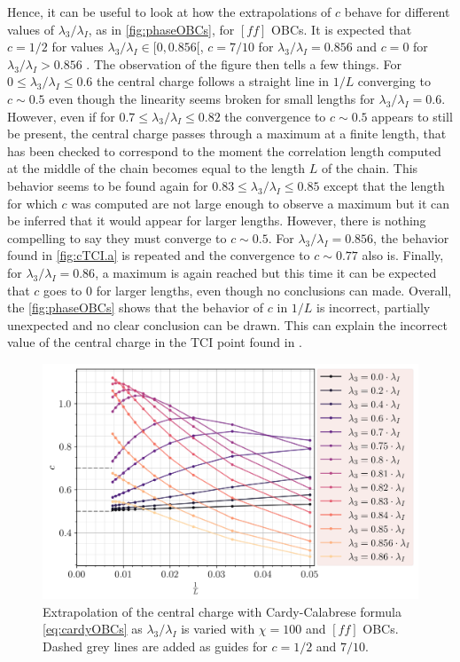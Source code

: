 	Hence, it can be useful to look at how the extrapolations of $c$ behave for different values of $\lambda_3/\lambda_I$, as in \autoref{fig:phaseOBCs}, for $[ff]$ OBCs. It is expected that $c =1/2$ for values $\lambda_3/\lambda_I \in [0, 0.856[$, $c=7/10$ for $\lambda_3/\lambda_I =0.856$ and $c=0$ for $\lambda_3/\lambda_I>0.856$ \cite{obrien2018}. The observation of the figure then tells a few things. For $0\leq \lambda_3/\lambda_I \leq 0.6$ the central charge follows a straight line in $1/L$ converging to $c\sim 0.5$ even though the linearity seems broken for small lengths for $\lambda_3/\lambda_I=0.6$. However, even if for $0.7\leq \lambda_3/\lambda_I \leq 0.82$ the convergence to $c\sim 0.5$ appears to still be present, the central charge passes through a maximum at a finite length, that has been checked to correspond to the moment the correlation length computed at the middle of the chain becomes equal to the length $L$ of the chain. %
	This behavior seems to be found again for $0.83\leq \lambda_3/\lambda_I \leq 0.85$ except that the length for which $c$ was computed are not large enough to observe a maximum but it can be inferred that it would appear for larger lengths. However, there is nothing compelling to say they must converge to $c\sim 0.5$. For $\lambda_3/\lambda_I=0.856$, the behavior found in \autoref{fig:cTCI.a} is repeated and the convergence to $c\sim 0.77$ also is. Finally, for $\lambda_3/\lambda_I=0.86$, a maximum is again reached but this time it can be expected that $c$ goes to $0$ for larger lengths, even though no conclusions can made. Overall, the \autoref{fig:phaseOBCs} shows that the behavior of $c$ in $1/L$ is incorrect, partially unexpected and no clear conclusion can be drawn. This can explain the incorrect value of the central charge in the TCI point found in \cite{obrien2018}.

	\begin{figure}[h!]
		\centering
		\includegraphics[scale=0.66]{../graphs/phase/ff/chi=100.0_J=1.0_h=1.0_i=1.0_c=0.0.png}
		\caption{Extrapolation of the central charge with Cardy-Calabrese formula \eqref{eq:cardyOBCs} as $\lambda_3/\lambda_I$ is varied with $\chi=100$ and $[ff]$ OBCs. Dashed grey lines are added as guides for $c=1/2$ and $7/10$.}
		\label{fig:phaseOBCs}
	\end{figure}


